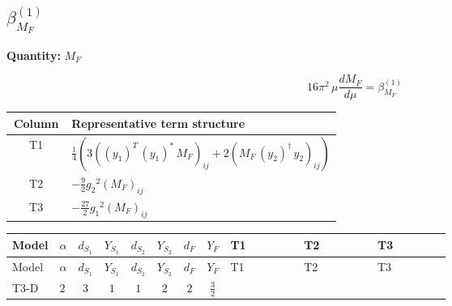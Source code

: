 \documentclass[8pt]{article}
\begin{document}
\begin{landscape}
\section*{$\beta_{M_F}^{(1)}$}
\noindent\textbf{Quantity: }$M_F$\par\smallskip
\[16\pi^2\,\mu\frac{d M_F}{d\mu}=\beta_{M_F}^{(1)}\]
\begin{center}
\begin{tabular}{@{}c >{\raggedright\arraybackslash}p{0.82\linewidth}@{}}
\toprule
Column & Representative term structure \\
\midrule
T1 & \(\displaystyle \frac{1}{4} (3 \left(\left({y_1}\right)^{T}\,\left({y_1}\right)^{*}\,{M_F}\right)_{ij}+2 \left({M_F}\,\left({y_2}\right)^{\dagger}\,{y_2}\right)_{ij})\) \\
\midrule
T2 & \(\displaystyle -\frac{9}{2} {g_2}^2 \left({M_F}\right)_{ij}\) \\
\midrule
T3 & \(\displaystyle -\frac{27}{2} {g_1}^2 \left({M_F}\right)_{ij}\) \\
\midrule
\bottomrule
\end{tabular}
\end{center}
\smallskip
\tiny
\begin{longtable}{@{}llcccccc >{\raggedright\arraybackslash}p{0.21\linewidth} >{\raggedright\arraybackslash}p{0.21\linewidth} >{\raggedright\arraybackslash}p{0.21\linewidth}@{}}
\toprule
Model & $\alpha$ & $d_{S_1}$ & $Y_{S_1}$ & $d_{S_2}$ & $Y_{S_2}$ & $d_F$ & $Y_F$ & T1 & T2 & T3 \\
\midrule
\endfirsthead
\toprule
Model & $\alpha$ & $d_{S_1}$ & $Y_{S_1}$ & $d_{S_2}$ & $Y_{S_2}$ & $d_F$ & $Y_F$ & T1 & T2 & T3 \\
\midrule
\endhead
T3-D & $2$ & $3$ & $1$ & $1$ & $2$ & $2$ & $\frac{3}{2}$ & \scriptsize\adjustbox{max width=\linewidth}{$\begin{gathered} \frac{1}{4} (3 \left(\left({y_1}\right)^{T}\,\left({y_1}\right)^{*}\,{M_F}\right)_{ij}+2 \left({M_F}\,\left({y_2}\right)^{\dagger}\,{y_2}\right)_{ij})\end{gathered}$} & \scriptsize\adjustbox{max width=\linewidth}{$\begin{gathered} -\frac{9}{2} {g_2}^2 \left({M_F}\right)_{ij}\end{gathered}$} & \scriptsize\adjustbox{max width=\linewidth}{$\begin{gathered} -\frac{27}{2} {g_1}^2 \left({M_F}\right)_{ij}\end{gathered}$} \\
\midrule
\bottomrule
\end{longtable}
\clearpage

\end{landscape}
\end{document}
